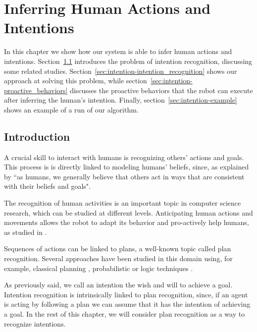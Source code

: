 \chapter{Inferring Human Actions and Intentions} %

\label{chapter:intention} %


In this chapter we show how our system is able to infer human actions and intentions. Section~\ref{sec:intention-intro} introduces the problem of intention recognition, discussing some related studies. Section~\ref{sec:intention-intention_recognition} shows our approach at solving this problem, while section~\ref{sec:intention-proactive_behaviors} discusses the proactive behaviors that the robot can execute after inferring the human's intention.  Finally, section~\ref{sec:intention-example} shows an example of a run of our algorithm.


\section{Introduction}
\label{sec:intention-intro}
A crucial skill to interact with humans is recognizing others' actions and goals. This process is is directly linked to modeling humans' beliefs, since, as explained by \cite{byom2013theory} ``as humans, we generally believe that others act in ways that are consistent with their beliefs and goals". 

The recognition of human activities is an important topic in computer science research, which can be studied at different levels. Anticipating human actions and movements allows the robot to adapt its behavior and pro-actively help humans, as studied in \cite{koppula2013anticipating}. 

Sequences of actions can be linked to plans, a well-known topic called plan recognition. Several approaches have been studied in this domain using, for example, classical planning \citep{ramirez2009plan}, probabilistic \citep{bui2003general} or logic techniques \citep{singla2011abductive}.

As previously said, we call an intention the wish and will to achieve a goal. Intention recognition is intrinsically linked to plan recognition, since, if an agent is acting by following a plan we can assume that it has the intention of achieving a goal. In the rest of this chapter, we will consider plan recognition as a way to recognize intentions. 

